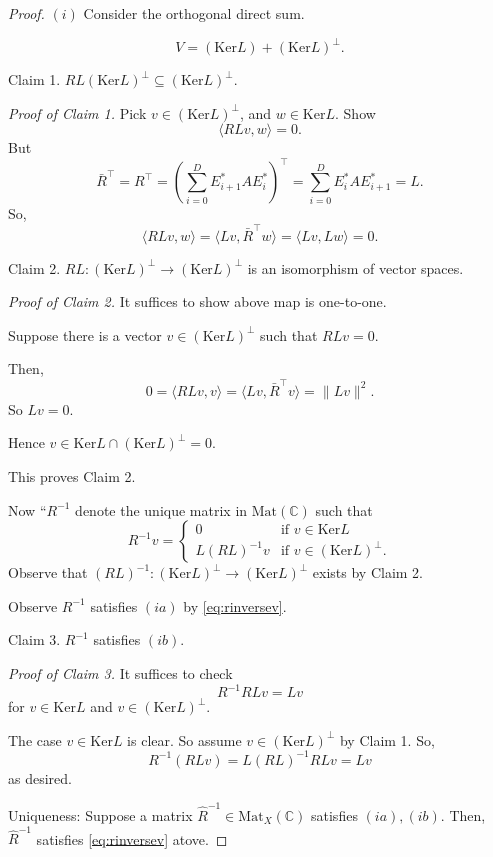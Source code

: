 \documentclass[
]{book}
\theoremstyle{definition}
\theoremstyle{definition}
\theoremstyle{definition}
\theoremstyle{definition}
\theoremstyle{remark}
\begin{document}
\begin{proof}
\leavevmode

\((i)\) Consider the orthogonal direct sum.

\[V = (\mathrm{Ker}L) + (\mathrm{Ker}L)^\bot.\]

Claim 1. \(RL(\mathrm{Ker}L)^\bot \subseteq (\mathrm{Ker}L)^\bot\).

\emph{Proof of Claim 1.}
Pick \(v\in (\mathrm{Ker}L)^\bot\), and \(w\in \mathrm{Ker}L\). Show
\[\langle RLv, w\rangle = 0.\]
But
\[\bar{R}^\top = R^\top = \left(\sum_{i=0}^D E^*_{i+1}AE^*_i\right)^\top = \sum_{i=0}^D E^*_iAE^*_{i+1} = L.\]
So,
\[\langle RLv, w\rangle = \langle Lv, \bar{R}^\top w\rangle = \langle Lv, Lw\rangle = 0.\]

\hfill\break
Claim 2. \(RL: (\mathrm{Ker}L)^\bot \to (\mathrm{Ker}L)^\bot\) is an isomorphism of vector spaces.

\emph{Proof of Claim 2.}
It suffices to show above map is one-to-one.

Suppose there is a vector \(v\in (\mathrm{Ker}L)^\bot\) such that \(RLv = 0\).

Then,
\[0 = \langle RLv , v\rangle = \langle Lv, \bar{R}^\top v\rangle = \|Lv\|^2.\]
So \(Lv = 0\).

Hence \(v\in \mathrm{Ker}L \cap (\mathrm{Ker}L)^\bot = 0\).

This proves Claim 2.

Now ``\(R^{-1}\) denote the unique matrix in \(\mathrm{Mat}(\mathbb{C})\) such that
\begin{equation}
R^{-1}v = \begin{cases}
0 & \text{if } v\in \mathrm{Ker}L \\
L(RL)^{-1}v & \text{if } v\in (\mathrm{Ker}L)^\bot.
\end{cases}\label{eq:rinversev}
\end{equation}
Observe that \((RL)^{-1}:(\mathrm{Ker}L)^\bot \to (\mathrm{Ker}L)^\bot\) exists by Claim 2.

Observe \(R^{-1}\) satisfies \((ia)\) by \eqref{eq:rinversev}.

Claim 3. \(R^{-1}\) satisfies \((ib)\).

\emph{Proof of Claim 3.}
It suffices to check
\[R^{-1}RLv = Lv\]
for \(v\in \mathrm{Ker}L\) and \(v\in (\mathrm{Ker}L)^\bot\).

The case \(v\in \mathrm{Ker}L\) is clear. So assume \(v\in (\mathrm{Ker}L)^\bot\) by Claim 1.
So,
\[R^{-1}(RLv) = L(RL)^{-1}RLv = Lv\]
as desired.

Uniqueness:
Suppose a matrix \(\hat{R}^{-1}\in \mathrm{Mat}_X(\mathbb{C})\) satisfies \((ia), (ib)\). Then, \(\hat{R}^{-1}\) satisfies \eqref{eq:rinversev} atove.


\end{proof}
\end{document}
